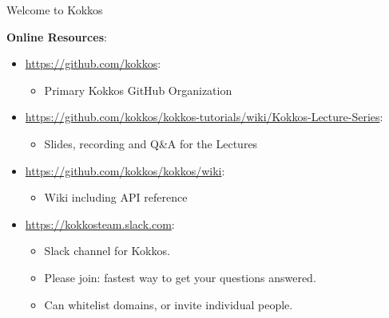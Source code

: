 \begin{frame}[fragile]{Welcome to Kokkos}

\textbf{Online Resources}:

\begin{itemize}
        \item \url{https://github.com/kokkos}:
                \begin{itemize}
                        \item Primary Kokkos GitHub Organization
                \end{itemize}
        \item \url{https://github.com/kokkos/kokkos-tutorials/wiki/Kokkos-Lecture-Series}:
                \begin{itemize}
			\item{Slides, recording and Q\&A for the Lectures}
                \end{itemize}
        \item \url{https://github.com/kokkos/kokkos/wiki}:
                \begin{itemize}
                        \item Wiki including API reference
                \end{itemize}
        \item \url{https://kokkosteam.slack.com}:
                \begin{itemize}
                        \item Slack channel for Kokkos.
                        \item Please join: fastest way to get your questions answered.
                        \item Can whitelist domains, or invite individual people.
                \end{itemize}
\end{itemize}

\end{frame}

